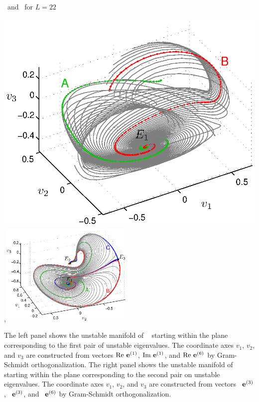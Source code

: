 \documentclass{theo1poster}[2003/04/25]
\begin{document}
\begin{poster}{3}
\begin{sheet}{\Eqva\ and \reqva\ for $L=22$}
\centerline{\includegraphics[width=.48\textwidth]{../../figs/ks22_E1_plane1_manifold_c.eps},\includegraphics[width=0.48\textwidth]{../../figs/ks22_E1_plane2_manifold_c.eps}}
The left panel shows the unstable
manifold of \eqv\  starting within the plane
corresponding to the first pair of unstable eigenvalues. The
coordinate axes $v_1$, $v_2$, and $v_3$ are constructed from vectors
${\rm Re\,} \,{\mathbf e}^{(1)}$, ${\rm Im\,} \,{\mathbf e}^{(1)}$,
and ${\rm Re\,} \,{\mathbf e}^{(6)}$
by Gram-Schmidt orthogonalization. The right panel shows the unstable
manifold of \eqv\  starting within the plane
corresponding to the second pair on unstable eigenvalues. The
coordinate axes $v_1$, $v_2$, and $v_3$ are constructed from vectors
\Re\, ${\mathbf e}^{(3)}$, \Im\, ${\mathbf e}^{(3)}$, and \Re\, ${\mathbf e}^{(6)}$
by Gram-Schmidt orthogonalization.


\end{sheet}
\end{poster}
\end{document}
